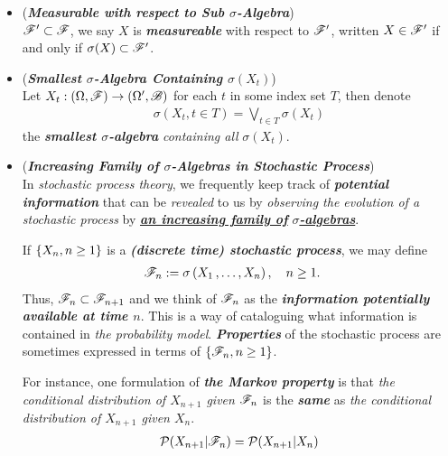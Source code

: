 \documentclass[11pt]{article}
\begin{document}
\begin{itemize}
\item \begin{remark} (\emph{\textbf{Measurable with respect to Sub $\sigma$-Algebra}})\\
 ${\mathscr F}' \subset {\mathscr F}$, we say $X$ is \emph{\textbf{measureable}} with respect to ${\mathscr F}'$, written $X\in {\mathscr F}'$ if and only if $\sigma(X)\subset {\mathscr F}'$.
 \end{remark}
 
 \item \begin{definition} (\emph{\textbf{Smallest $\sigma$-Algebra Containing $\sigma(X_t)$}})\\ 
 Let $X_t:  (\Omega, {\mathscr F}) \rightarrow (\Omega', {\mathscr B})$ for each $t$ in some index set $T$, then denote
 \begin{align*}
 \sigma(X_{t}, t\in T) = \bigvee_{t\in T}\sigma(X_{t})
 \end{align*} the \emph{\textbf{smallest $\sigma$-algebra}} \emph{containing all} $\sigma(X_t)$.
 \end{definition}
 
 \item \begin{remark} (\emph{\textbf{Increasing Family of $\sigma$-Algebras in Stochastic Process}})\\
In \emph{stochastic process theory}, we frequently keep track of \emph{\textbf{potential information}} that can be \emph{revealed} to us by \emph{observing the evolution of a stochastic process} by \underline{\emph{\textbf{an increasing family of}}} \underline{\emph{\textbf{$\sigma$-algebras}}}. 

If $\left\{X_n, n \ge1\right\}$ is a \emph{\textbf{(discrete time) stochastic process}}, we may define
\begin{align*}
{\mathscr F}_n &:= \sigma\left(X_1 \,{,}\ldots{,}\, X_n\right), \quad n\ge 1.
\end{align*}
Thus, ${\mathscr F}_n \subset {\mathscr F}_{n+1}$ and we think of ${\mathscr F}_n$ as the \emph{\textbf{information potentially available at time $n$}}. This is a way of cataloguing what information is contained in \emph{the probability model}. \emph{\textbf{Properties}} of the stochastic process are sometimes expressed in
terms of $\left\{{\mathscr F}_n, n \ge 1\right\}$. 

For instance, one formulation of \emph{\textbf{the Markov property}} is that \emph{the conditional distribution of $X_{n+1}$ given ${\mathscr F}_n$} is the \emph{\textbf{same}} as \emph{the conditional distribution of $X_{n+1}$ given $X_n$}. 
\begin{align*}
{\mathcal P}(X_{n+1} | {\mathscr F}_{n}) = {\mathcal P}(X_{n+1} | X_{n}) 
\end{align*}
 \end{remark}
 

\end{itemize}
\end{document}
